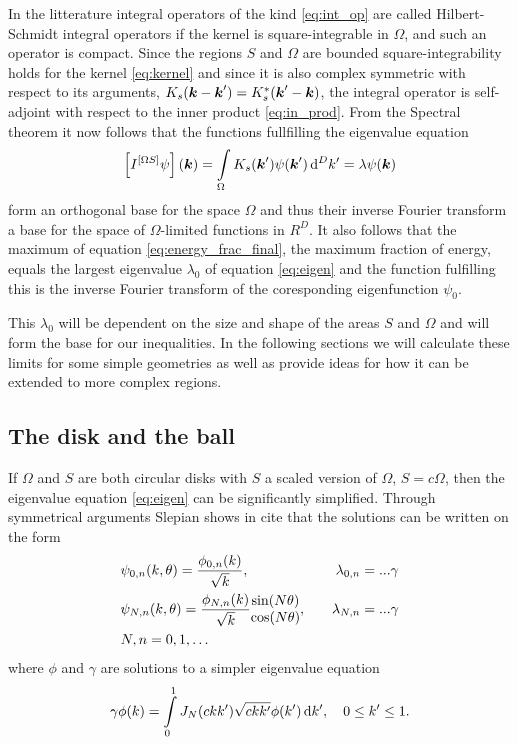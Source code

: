 \documentclass[11pt,a4paper, 
english, swedish %
]{article}
\begin{document}
 In the litterature integral operators of the kind \eqref{eq:int_op} are called Hilbert-Schmidt integral operators if the kernel is square-integrable in $\Omega$, and such an operator is compact. Since the regions $S$ and $\Omega$ are bounded square-integrability holds for the kernel \eqref{eq:kernel} and since it is also complex symmetric with respect to its arguments, $K_s(\vb*k-\vb*k')=K_s^*(\vb*k'-\vb*k)$, the integral operator is self-adjoint with respect to the inner product \eqref{eq:in_prod}. From the Spectral theorem it now follows that the functions fullfilling the eigenvalue equation
\begin{equation}
  \label{eq:eigen}
\qty[I^{[\Omega S]}\psi](\vb*k)=\int_\Omega K_s(\vb*k')\psi(\vb*k') \id^Dk'=\lambda \psi(\vb*k)
\end{equation}
form an orthogonal base for the space $\Omega$ and thus their inverse Fourier transform a base for the space of $\Omega$-limited functions in $R^D$. It also follows that the maximum of equation \eqref{eq:energy_frac_final}, the maximum fraction of energy, equals the largest eigenvalue $\lambda_0$ of equation \eqref{eq:eigen} and the function fulfilling this is the inverse Fourier transform of the coresponding eigenfunction $\psi_0$.

This $\lambda_0$ will be dependent on the size and shape of the areas $S$ and $\Omega$ and will form the base for our inequalities. In the following sections we will calculate these limits for some simple geometries as well as provide ideas for how it can be extended to more complex regions.

\subsection{The disk and the ball}
If $\Omega$ and $S$ are both circular disks with $S$ a scaled version of $\Omega$, $S=c\Omega$, then the eigenvalue equation \eqref{eq:eigen} can be significantly simplified. Through symmetrical arguments Slepian shows in cite that the solutions can be written on the form
\begin{align}
 &\psi_{0,n}(k,\theta)=\frac{\phi_{0,n}(k)}{\sqrt{k}}, \quad &\lambda_{0,n}= ...\gamma \\
  &\psi_{N,n}(k, \theta)=\frac{\phi_{N,n}(k)}{\sqrt{k}}\mqty{\sin(N\theta)\\ \cos(N\theta)} , \quad &\lambda_{N,n}= ... \gamma\\
  &N,n=0,1,\ldots
\end{align}
where $\phi$ and $\gamma$ are solutions to a simpler eigenvalue equation
\begin{equation}
  \label{eq:Bessel_int}
\gamma\phi(k)=\int_0^1 J_N(ckk')\sqrt{ckk'}\phi(k')\id k', \quad 0\leq k' \leq 1.
\end{equation}
\end{document}
